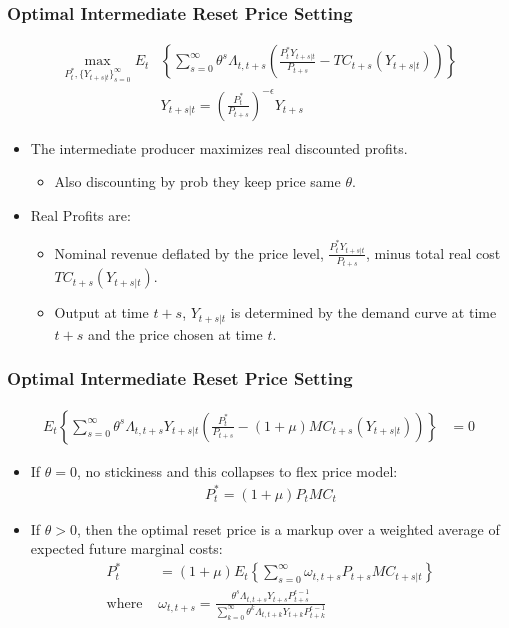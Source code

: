\documentclass[english,xcolor=svgnames]{beamer}
\begin{document}
\begin{frame}
\frametitle{Optimal Intermediate Reset Price Setting
}
\begin{align*}
	\max_{P_{t}^*,\{Y_{t+s|t}\}_{s=0}^{\infty}}E_t &\left\{\sum_{s=0}^{\infty}\theta^s\Lambda_{t,t+s}\left(\frac{P_t^*Y_{t+s|t}}{P_{t+s}} -TC_{t+s}(Y_{t+s|t})\right)\right\}\\
	&Y_{t+s|t}=\left(\frac{P_t^*}{P_{t+s}}\right)^{-\epsilon} Y_{t+s}
\end{align*}
\begin{itemize}
	\item The intermediate producer maximizes real discounted profits.
	\begin{itemize}
		\item Also discounting by prob they keep price same $\theta$.
	\end{itemize}
	\item Real Profits are:
	\begin{itemize}
		\item Nominal revenue  deflated by the price level, $\frac{P_t^*Y_{t+s|t}}{P_{t+s}}$, minus total real cost $TC_{t+s}(Y_{t+s|t})$.
		\item Output at time $t+s$, $Y_{t+s|t}$ is determined by the demand curve at time $t+s$ and the price chosen at time $t$.
	\end{itemize}
\end{itemize}
\end{frame}


\begin{frame}
\frametitle{Optimal Intermediate Reset Price Setting
}
\begin{align*}
	E_t \left\{\sum_{s=0}^{\infty}\theta^s\Lambda_{t,t+s}Y_{t+s|t}\left(\frac{P_t^*}{P_{t+s}} - (1+\mu) MC_{t+s}(Y_{t+s|t})\right)\right\}&=0
\end{align*}
\begin{itemize}
	\item If $\theta=0$, no stickiness and this collapses to flex price model:
	\begin{align*}
		P_t^* = (1+\mu) P_{t}MC_{t}
	\end{align*}
	\item If $\theta>0$, then the optimal reset price is a markup over a weighted average of expected future marginal costs:
	\begin{align*}
		P_t^* &=  (1+\mu)E_t\left\{\sum_{s=0}^{\infty}\omega_{t,t+s}P_{t+s}MC_{t+s|t}\right\} \\
		\text{where }&\omega_{t,t+s}=\frac{\theta^s\Lambda_{t,t+s}Y_{t+s}P_{t+s}^{\epsilon-1}}{\sum_{k=0}^{\infty}\theta^k\Lambda_{t,t+k}Y_{t+k}P_{t+k}^{\epsilon-1}}
	\end{align*}
\end{itemize}
\end{frame}
\end{document}
